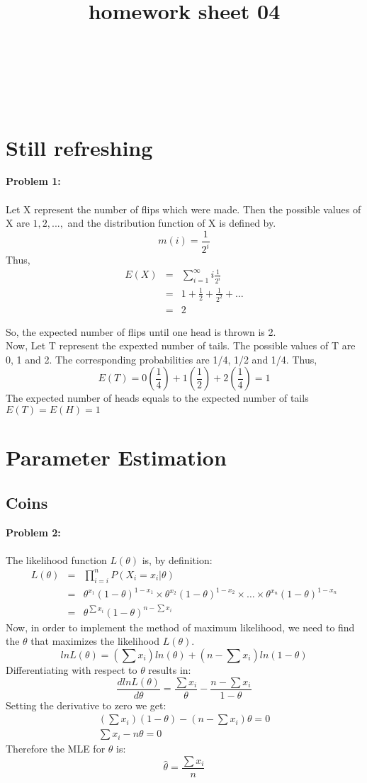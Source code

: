 \documentclass{article}
\title{homework sheet 04}
\author{
	\name{Denys Sobchyshak}\\
	\imat{03636581}\\
	\email{denys.sobchyshak@gmail.com}
	\And
	\name{Sergey Zakharov}\\
	\imat{03636642}\\
	\email{ga39pad@mytum.de}
}
\begin{document}
\maketitle

\section{Still refreshing}
\textbf{Problem 1:} \\\\
	 Let X represent the number of flips which were made. Then the possible values of X
	are $1, 2, ... ,$ and the distribution function of X is deﬁned by.
	\[ m(i) =\frac{1}{2^i} \]
	Thus,
	\begin{eqnarray*}
  	E(X) & = & \sum_{i=1}^{\infty}{i \frac{1}{2^i}} \\
 	  & = & 1+ \frac{1}{2} +\frac{1}{2^2} + \dots \\
  	 & = & 2
	\end{eqnarray*}

	So, the expected number of flips until one head is thrown is 2. \\
	Now, Let T represent the expexted number of tails. The possible values of T are 0, 1 and 2. The corresponding probabilities are 1/4, 1/2 and 1/4. Thus,
	\[ E(T) = 0(\frac{1}{4}) + 1(\frac{1}{2}) + 2 (\frac{1}{4}) = 1\]
	The expected number of heads equals to the expected number of tails $E(T) = E(H) = 1$

\section{Parameter Estimation}
\subsection{Coins}
\textbf{Problem 2:}\\\\
	The likelihood function $L(\theta)$ is, by definition:
	\begin{eqnarray*}
  	L(\theta) & = &\prod_{i=i}^{n}{P(X_i = x_i|\theta)} \\
 	  & = & \theta^{x_1}(1-\theta)^{1-x_1} \times \theta^{x_2}(1-\theta)^{1-x_2} \times \dots \times \theta^{x_n}(1-\theta)^{1-x_n} \\
  	 & = & \theta^{\sum{x_i}}(1-\theta)^{n-\sum{x_i}}
	\end{eqnarray*}
Now, in order to implement the method of maximum likelihood, we need to find the $\theta$ that maximizes the likelihood $L(\theta)$.
\[ ln L(\theta) = (\sum{x_i})ln(\theta) + (n-\sum{x_i})ln(1-\theta) \]
Differentiating with respect to $\theta$ results in:
\[ \frac{d ln L(\theta)}{d\theta} = \frac{\sum{x_i}}{\theta} - \frac{n-\sum{x_i}}{1-\theta} \]
Setting the derivative to zero we get:
\begin{eqnarray*}
(\sum{x_i})(1- \theta) - (n-\sum{x_i})\theta = 0 \\
\sum{x_i} - n\theta = 0
\end{eqnarray*}
Therefore the MLE for $\theta$ is:
\[ \hat{\theta} = \frac{\sum{x_i}}{n} \]
\end{document}
